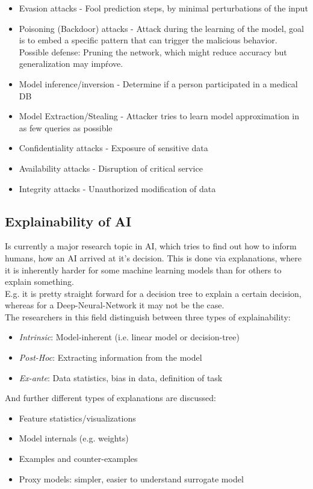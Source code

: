 \documentclass[12pt,a4paper]{article}
\begin{document}
\begin{itemize}
    \item Evasion attacks - Fool prediction steps, by minimal perturbations of the input
    \item Poisoning (Backdoor) attacks - Attack during the learning of the model, goal is to embed a specific pattern that can trigger the malicious behavior. Possible defense: Pruning the network, which might reduce accuracy but generalization may impŕove.
    \item Model inference/inversion - Determine if a person participated in a medical DB
    \item Model Extraction/Stealing - Attacker tries to learn model approximation in as few queries as possible
    \item Confidentiality attacks - Exposure of sensitive data
    \item Availability attacks - Disruption of critical service
    \item Integrity attacks - Unauthorized modification of data
\end{itemize}


\subsection{Explainability of AI}

\noindent Is currently a major research topic in AI, which tries to find out how to inform humans, how an AI arrived at it's decision. This is done via explanations, where it is inherently harder for some machine learning models than for others to explain something.\\
E.g. it is pretty straight forward for a decision tree to explain a certain decision, whereas for a Deep-Neural-Network it may not be the case.\\
The researchers in this field distinguish between three types of explainability:
\begin{itemize}
    \item \textit{Intrinsic}: Model-inherent (i.e. linear model or decision-tree)
    \item \textit{Post-Hoc}: Extracting information from the model
    \item \textit{Ex-ante}: Data statistics, bias in data, definition of task
\end{itemize}

\noindent And further different types of explanations are discussed:

\begin{itemize}
    \item Feature statistics/visualizations
    \item Model internals (e.g. weights)
    \item Examples and counter-examples
    \item Proxy models: simpler, easier to understand surrogate model
\end{itemize}
\end{document}

